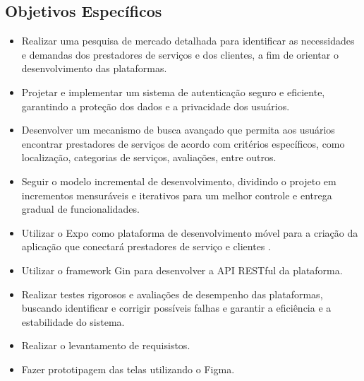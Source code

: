 \subsection{Objetivos Específicos}
\begin{itemize}
  \item Realizar uma pesquisa de mercado detalhada para identificar as necessidades e demandas dos prestadores de serviços e dos clientes, a fim de orientar o desenvolvimento das plataformas.
  \item Projetar e implementar um sistema de autenticação seguro e eficiente, garantindo a proteção dos dados e a privacidade dos usuários.
  \item Desenvolver um mecanismo de busca avançado que permita aos usuários encontrar prestadores de serviços de acordo com critérios específicos, como localização, categorias de serviços, avaliações, entre outros.
  \item Seguir o modelo incremental de desenvolvimento, dividindo o projeto em incrementos mensuráveis e iterativos para um melhor controle e entrega gradual de funcionalidades.
  \item Utilizar o Expo como plataforma de desenvolvimento móvel para a criação da aplicação que conectará prestadores de serviço e clientes	.
  \item Utilizar o framework Gin para desenvolver a API RESTful da plataforma.
  \item Realizar testes rigorosos e avaliações de desempenho das plataformas, buscando identificar e corrigir possíveis falhas e garantir a eficiência e a estabilidade do sistema.
  \item Realizar o levantamento de requisistos.
  \item Fazer prototipagem das telas utilizando o Figma.
\end{itemize}
